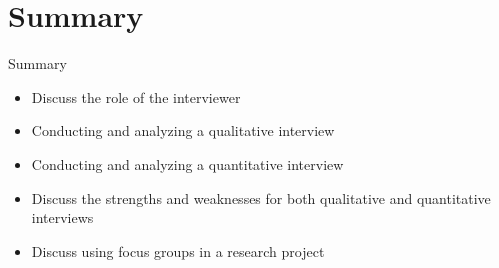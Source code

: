 \section{Summary}\label{ch10:summary}

\begin{center}
	\begin{tkawybox}{Summary}
		\begin{itemize}
			\setlength{\itemsep}{0pt}
			\setlength{\parskip}{0pt}
			\setlength{\parsep}{0pt}
			
			\item Discuss the role of the interviewer
			\item Conducting and analyzing a qualitative interview
			\item Conducting and analyzing a quantitative interview
			\item Discuss the strengths and weaknesses for both qualitative and quantitative interviews
			\item Discuss using focus groups in a research project
			
		\end{itemize}
	\end{tkawybox}
\end{center}
